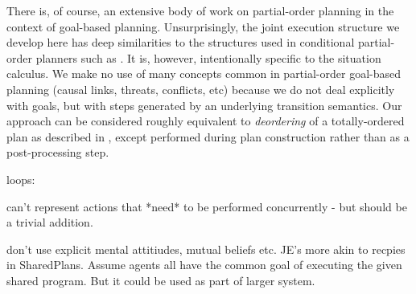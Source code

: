 There is, of course, an extensive body of work on partial-order planning
in the context of goal-based planning. Unsurprisingly, the joint execution
structure we develop here has deep similarities to the structures
used in conditional partial-order planners such as \citep{peot92conditional_nonlinear}.
It is, however, intentionally specific to the situation calculus.
We make no use of many concepts common in partial-order goal-based
planning (causal links, threats, conflicts, etc) because we do not
deal explicitly with goals, but with steps generated by an underlying
transition semantics. Our approach can be considered roughly equivalent
to \emph{deordering} of a totally-ordered plan as described in \citep{backstrom99reordering},
except performed during plan construction rather than as a post-processing
step.

loops: \citep{levesque96what_is_planning,levesque05planning_with_loops}

can't represent actions that {*}need{*} to be performed concurrently
- but should be a trivial addition.

don't use explicit mental attitiudes, mutual beliefs etc. JE's more
akin to recpies in SharedPlans. Assume agents all have the common
goal of executing the given shared program. But it could be used as
part of larger system.

